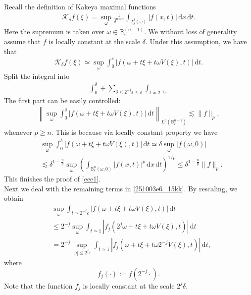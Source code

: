 \documentclass{article}
\numberwithin{equation}{section}
\theoremstyle{plain}
\begin{document}
Recall the definition of Kakeya maximal functions
	\begin{align}
		\mathcal{K}_\delta f(\xi)= \sup_\omega \frac{1}{\delta^{n-1}}\int_{T_{\xi}^{\delta}(\omega)} |f(x,t)| \,\text{d}x\,\text{d}t.
	\end{align}
	Here the supremum is taken over $\omega\in \mathbb{B}^{(n-1)}_\varepsilon$. We without loss of generality assume that  $f$ is locally constant at the scale $\delta$. Under this assumption, we have that 
	\begin{align}
		\mathcal{K}_\delta f(\xi)\simeq \sup_\omega \int_0^\varepsilon |f(\omega+t\xi+t\omega V(\xi),t)| \,\text{d}t.
	\end{align}
	Split the integral into
	\begin{align}\label{251003e6_15kk}
		\int_0^\delta+ \sum_{\delta\le 2^{-j}\varepsilon\le \varepsilon}\int_{t\simeq 2^{-j}\varepsilon}
	\end{align}
	The first part can be easily controlled:  
	\begin{align}\label{eee1}
		\left\|   \sup_\omega \int_0^\delta |f(\omega+t\xi+t\omega V(\xi),t)| \,\text{d}t   \right\|_{L^p(\mathbb{B}_\varepsilon^{n-1})}  \lesssim \|f\|_p,
	\end{align}
	whenever $p\ge n$. 
	This is because via locally constant property we have
	\begin{align*}
		& \sup_\omega \int_0^\delta |f(\omega+t\xi+t\omega V(\xi),t)| \,\text{d}t
		\simeq \delta \sup_\omega |f(\omega, 0)|  \\
		&\lesssim \delta^{1-\frac{n}{p}} \sup_\omega  \left( \int_{\mathbb{B}^n_\delta(\omega,0)} |f(x,t)|^p \,\text{d}x\,\text{d}t\right)^{1/p} \le \delta^{1-\frac{n}{p}} \|f\|_p.
	\end{align*}
This finishes the proof of \eqref{eee1}. \\



	Next we deal with the remaining terms in \eqref{251003e6_15kk}.  By rescaling, we obtain 
	\begin{align}
		& \sup_\omega \int_{t\simeq 2^{-j}\varepsilon} |f(\omega+ t\xi+ t\omega V(\xi),t)| \,\text{d}t \\
		&\leq 2^{-j}\sup_\omega \int_{t\simeq 1} |f_j(2^j\omega+ t\xi+ t\omega V(\xi), t)| \,\text{d}t  \\
		&= 2^{-j}\sup_{|\omega|\le 2^j\varepsilon} \int_{t\simeq 1} |f_j(\omega+ t\xi+ t\omega 2^{-j} V(\xi), t)| \,\text{d}t, \label{251003e6_19kk}
	\end{align}
	where
\begin{equation}
f_j(\cdot):= f(2^{-j}\cdot).
\end{equation}
Note that the function $f_j$ is locally constant at the scale $2^j \delta$. \\
\end{document}
